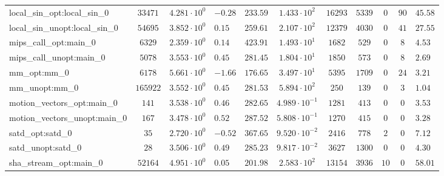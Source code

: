 \begin{tabular}{|l|c|HHc|c|c|c|c|cH|}
local\_sin\_opt:local\_sin\_0                   & $ 33471    $ & $ 4.281 \cdot 10^{0} $ & $ -0.28 $ & $ 233.59 $ & $ 1.433 \cdot 10^{2}  $ & $ 16293  $ & $ 5339  $ & $ 0   $ & $ 90  $ & $ 45.58   $ \\
local\_sin\_unopt:local\_sin\_0                 & $ 54695    $ & $ 3.852 \cdot 10^{0} $ & $ 0.15  $ & $ 259.61 $ & $ 2.107 \cdot 10^{2}  $ & $ 12379  $ & $ 4030  $ & $ 0   $ & $ 41  $ & $ 27.55   $ \\
mips\_call\_opt:main\_0                         & $ 6329     $ & $ 2.359 \cdot 10^{0} $ & $ 0.14  $ & $ 423.91 $ & $ 1.493 \cdot 10^{1}  $ & $ 1682   $ & $ 529   $ & $ 0   $ & $ 8   $ & $ 4.53    $ \\
mips\_call\_unopt:main\_0                       & $ 5078     $ & $ 3.553 \cdot 10^{0} $ & $ 0.45  $ & $ 281.45 $ & $ 1.804 \cdot 10^{1}  $ & $ 1850   $ & $ 573   $ & $ 0   $ & $ 8   $ & $ 2.69    $ \\
mm\_opt:mm\_0                                   & $ 6178     $ & $ 5.661 \cdot 10^{0} $ & $ -1.66 $ & $ 176.65 $ & $ 3.497 \cdot 10^{1}  $ & $ 5395   $ & $ 1709  $ & $ 0   $ & $ 24  $ & $ 3.21    $ \\
mm\_unopt:mm\_0                                 & $ 165922   $ & $ 3.552 \cdot 10^{0} $ & $ 0.45  $ & $ 281.53 $ & $ 5.894 \cdot 10^{2}  $ & $ 250    $ & $ 139   $ & $ 0   $ & $ 3   $ & $ 1.04    $ \\
motion\_vectors\_opt:main\_0                    & $ 141      $ & $ 3.538 \cdot 10^{0} $ & $ 0.46  $ & $ 282.65 $ & $ 4.989 \cdot 10^{-1} $ & $ 1281   $ & $ 413   $ & $ 0   $ & $ 0   $ & $ 3.53    $ \\
motion\_vectors\_unopt:main\_0                  & $ 167      $ & $ 3.478 \cdot 10^{0} $ & $ 0.52  $ & $ 287.52 $ & $ 5.808 \cdot 10^{-1} $ & $ 1270   $ & $ 415   $ & $ 0   $ & $ 0   $ & $ 3.28    $ \\
satd\_opt:satd\_0                               & $ 35       $ & $ 2.720 \cdot 10^{0} $ & $ -0.52 $ & $ 367.65 $ & $ 9.520 \cdot 10^{-2} $ & $ 2416   $ & $ 778   $ & $ 2   $ & $ 0   $ & $ 7.12    $ \\
satd\_unopt:satd\_0                             & $ 28       $ & $ 3.506 \cdot 10^{0} $ & $ 0.49  $ & $ 285.23 $ & $ 9.817 \cdot 10^{-2} $ & $ 3627   $ & $ 1300  $ & $ 0   $ & $ 0   $ & $ 4.30    $ \\
sha\_stream\_opt:main\_0                        & $ 52164    $ & $ 4.951 \cdot 10^{0} $ & $ 0.05  $ & $ 201.98 $ & $ 2.583 \cdot 10^{2}  $ & $ 13154  $ & $ 3936  $ & $ 10  $ & $ 0   $ & $ 58.01   $ \\

\end{tabular}
